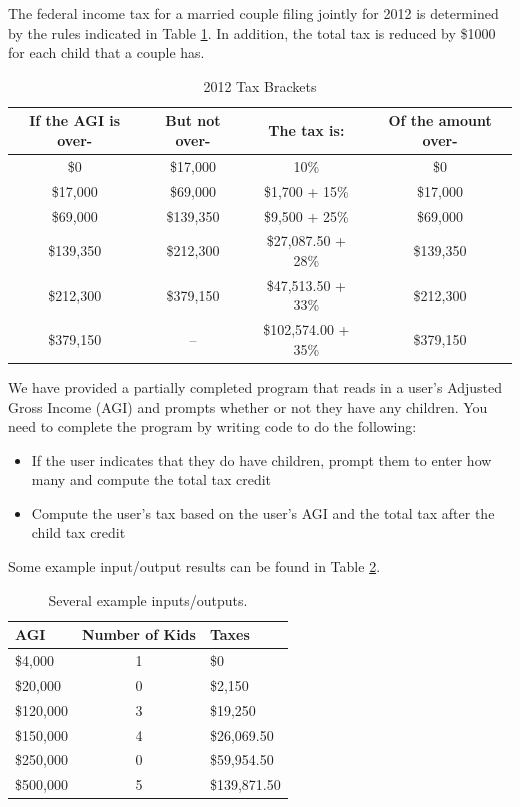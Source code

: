 \documentclass[12pt]{scrartcl}
\begin{document}
The federal income tax for a married couple filing jointly for 2012 is determined 
by the rules indicated in Table \ref{table:taxBrackets}.  In addition, the total tax is reduced by 
\$1000 for each child that a couple has.  

\begin{table}
\centering
\begin{tabular}{c|c|c|c}
If the AGI is over- & But not over- & The tax is: & Of the amount over- \\
\hline\hline
\$0 & \$17,000 & 10\% & \$0 \\
\$17,000 & \$69,000 & \$1,700 + 15\% & \$17,000 \\
\$69,000 & \$139,350 & \$9,500 + 25\% & \$69,000 \\
\$139,350 & \$212,300 & \$27,087.50 + 28\% & \$139,350 \\
\$212,300 & \$379,150 & \$47,513.50 + 33\% & \$212,300 \\
\$379,150 & --  & \$102,574.00 + 35\% & \$379,150 \\
\end{tabular}
\caption{2012 Tax Brackets}
\label{table:taxBrackets}
\end{table}

We have provided a partially completed program that reads in a user's 
Adjusted Gross Income (AGI) and prompts whether or not they have 
any children.  You need to complete the program by writing code to do 
the following:
\begin{itemize}
  \item If the user indicates that they do have children, prompt them to 
  	enter how many and compute the total tax credit
  \item Compute the user's tax based on the user's AGI and the total 
	tax after the child tax credit
\end{itemize}

Some example input/output results can be found in Table \ref{table:examples}.

\begin{table}
\centering
\begin{tabular}{l|c|l}
AGI & Number of Kids & Taxes \\
\hline\hline
\$4,000 & 1 & \$0 \\
\$20,000 & 0 & \$2,150 \\
\$120,000 & 3 & \$19,250 \\
\$150,000 & 4 & \$26,069.50 \\
\$250,000 & 0 & \$59,954.50 \\
\$500,000 & 5 & \$139,871.50 \\
\end{tabular}
\caption{Several example inputs/outputs.}
\label{table:examples}
\end{table}
\end{document}
